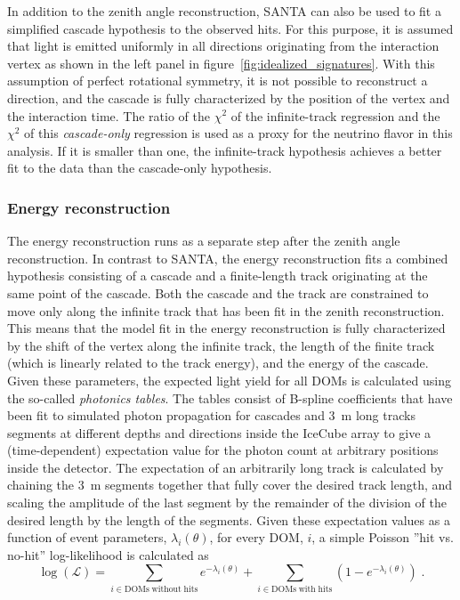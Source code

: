 In addition to the zenith angle reconstruction, SANTA can also be used to fit a simplified cascade hypothesis to the observed hits. For this purpose, it is assumed that light is emitted uniformly in all directions originating from the interaction vertex as shown in the left panel in figure~\ref{fig:idealized_signatures}. With this assumption of perfect rotational symmetry, it is not possible to reconstruct a direction, and the cascade is fully characterized by the position of the vertex and the interaction time. The ratio of the $\chi^2$ of the infinite-track regression and the $\chi^2$ of this \emph{cascade-only} regression is used as a proxy for the neutrino flavor in this analysis. If it is smaller than one, the infinite-track hypothesis achieves a better fit to the data than the cascade-only hypothesis.

\subsubsection{Energy reconstruction}
\label{sec:leera}
The energy reconstruction runs as a separate step after the zenith angle reconstruction. In contrast to \textsc{SANTA}, the energy reconstruction fits a combined hypothesis consisting of a cascade and a finite-length track originating at the same point of the cascade. Both the cascade and the track are constrained to move only along the infinite track that has been fit in the zenith reconstruction. This means that the model fit in the energy reconstruction is fully characterized by the shift of the vertex along the infinite track, the length of the finite track (which is linearly related to the track energy), and the energy of the cascade. Given these parameters, the expected light yield for all DOMs is calculated using the so-called \emph{photonics tables}. The tables consist of B-spline coefficients that have been fit to simulated photon propagation for cascades and 3~m long tracks segments at different depths and directions inside the IceCube array to give a (time-dependent) expectation value for the photon count at arbitrary positions inside the detector. The expectation of an arbitrarily long track is calculated by chaining the 3~m segments together that fully cover the desired track length, and scaling the amplitude of the last segment by the remainder of the division of the desired length by the length of the segments. Given these expectation values as a function of event parameters, $\lambda_i(\theta)$, for every DOM, $i$, a simple Poisson ''hit vs. no-hit'' log-likelihood is calculated as
\begin{equation}
    \log(\mathcal{L}) = \sum_{i\in\mathrm{DOMs\;without\;hits}} e^{-\lambda_i(\theta)} + \sum_{i\in\mathrm{DOMs\;with\;hits}} (1 - e^{-\lambda_i(\theta)})\;.
    \label{eq:leera-llh}
\end{equation}
